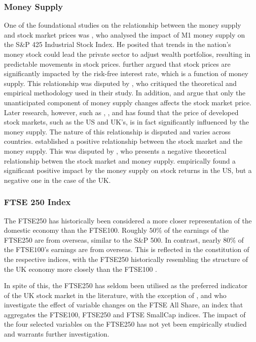 \documentclass[11pt,a4paper]{article}
\newcommand{\citeboth}[1]{\citeauthor{#1} \citep{#1}}
\begin{document}
\subsubsection{Money Supply}

One of the foundational studies on the relationship between the money supply and 
stock market prices was \citeboth{palmer1970}, who analysed the impact of M1 money supply on the S$\&$P 425 Industrial Stock Index. 
He posited that trends in the nation's money stock could lead the 
private sector to adjust wealth portfolios, resulting in 
predictable movements in stock prices. \citeboth{homa1971} further argued that 
stock prices are significantly impacted by the risk-free interest rate, 
which is a function of money supply. This relationship was disputed by \citeboth{pesando1974}, 
who critiqued the theoretical and empirical methodology used in their study. In addition, \citeboth{sorensen1982} and 
\citeboth{bernanke2005} argue that only the unanticipated component of money supply changes 
affects the stock market price. Later research, however, such as \citeboth{bahloul2017}, 
\citeboth{synek2024}, and \citeboth{pícha2017} has found that the price of developed stock markets, such as the US and UK's, is in fact significantly influenced by the money supply. 
The nature of this relationship is disputed and varies across countries. \citeboth{homa1971} established a positive relationship between the 
stock market and the money supply. This was disputed by \citeboth{sellin2001}, who presents a negative theoretical relationship betwen the stock market and money supply. \citeboth{olawale2014} empirically found a significant positive impact by the money supply on stock returns in the US, but a negative one in the case of the UK. 


\subsubsection{FTSE 250 Index}

The FTSE250 has historically been considered a more closer representation of the domestic economy than the FTSE100. Roughly $50\%$ of the earnings of the FTSE250 are from overseas, similar to the S\&P 500. In contrast, nearly $80\%$ of the FTSE$100$'s earnings are from overseas. 
This is reflected in the constitution of the respective indices, with the 
FTSE250 historically resembling the structure of the UK economy more closely than the FTSE100 \citep{ftse250history}.

In spite of this, the FTSE250 has seldom been utilised as the preferred indicator of the UK stock market in the literature,
with the exception of \citeboth{smit2023longrun}, \citeboth{khatri2024impact} and \citeboth{engstrom2006impact} who investigate the effect of variable changes on the FTSE All Share, an index that aggregates the 
FTSE100, FTSE250 and FTSE SmallCap indices. The impact of the four selected variables on the FTSE250 has not yet been empirically studied and 
warrants further investigation.
\end{document}
